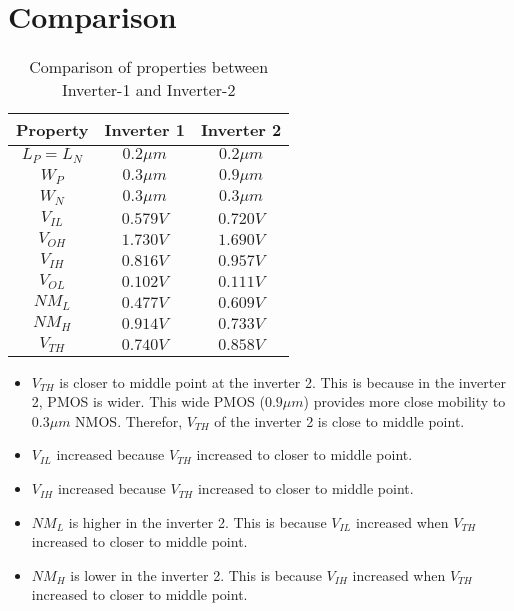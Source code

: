 \documentclass[a4paper,10pt]{article}
\begin{document}
\newpage
\section{Comparison}
 \begin{table}[h!]
\centering
\begin{tabular}{|c|c|c|}
\hline
\textbf{Property} & \textbf{Inverter 1} & \textbf{Inverter 2} \\
\hline
$L_P = L_N$ & $0.2\mu m$ & $0.2\mu m$ \\\hline
$W_P$       & $0.3\mu m$ & $0.9\mu m$ \\\hline
$W_N$       & $0.3\mu m$ & $0.3\mu m$ \\\hline
$V_{IL}$    & $0.579 V$& $0.720 V$ \\\hline
$V_{OH}$    & $1.730 V$& $1.690 V$\\\hline
$V_{IH}$    & $0.816 V$& $0.957 V$\\\hline
$V_{OL}$    & $0.102 V$& $0.111 V$\\\hline
$NM_L$      & $0.477 V$& $0.609 V$\\\hline
$NM_H$      & $0.914 V$& $0.733 V$\\\hline
$V_{TH}$    & $0.740 V$& $0.858 V$\\
\hline
\end{tabular}
\caption{Comparison of properties between Inverter-1 and Inverter-2}
\end{table}

\begin{itemize}
 \item $V_{TH}$ is closer to middle point at the inverter 2. This is because in the inverter 2, PMOS is wider. This wide PMOS ($0.9\mu m$) provides more close mobility to $0.3\mu m$ NMOS. Therefor, $V_{TH}$ of the inverter 2 is close to middle point.
 \item $V_{IL}$ increased because $V_{TH}$ increased to closer to middle point.
 \item $V_{IH}$ increased because $V_{TH}$ increased to closer to middle point.
 \item $NM_L$ is higher in the inverter 2. This is because $V_{IL}$ increased when $V_{TH}$ increased to closer to middle point.
 \item $NM_H$ is lower in the inverter 2. This is because $V_{IH}$ increased when $V_{TH}$ increased to closer to middle point.
\end{itemize}
\end{document}
